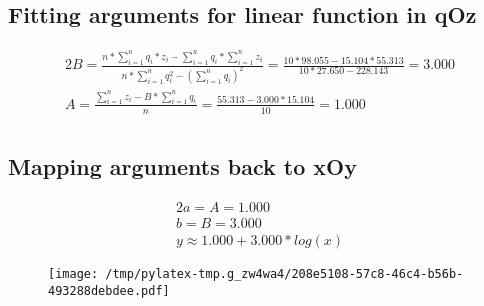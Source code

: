 \documentclass{article}%
\begin{document}
\subsection{Fitting arguments for linear function in qOz}%
\label{subsec:FittingargumentsforlinearfunctioninqOz}%
\begin{alignat*}{2}%
B
                    = \frac {n * \sum\limits_{i = 1}^n {q_i * z_i} - \sum\limits_{i = 1}^n {q_i} * \sum\limits_{i = 1}^n {z_i}}
                        {n * \sum\limits_{i = 1}^n {q_i^2} - (\sum\limits_{i = 1}^n {q_i}) ^ 2}
                    = \frac {10 * 98.055 - 15.104 * 55.313}
                        {10 * 27.650 - 228.143}
                    = 3.000 \\%
A
                    = \frac {\sum\limits_{i = 1}^n {z_i} - B * \sum\limits_{i = 1}^{n} {q_i}} n
                    = \frac {55.313 - 3.000 * 15.104} {10}
                    = 1.000 \\%
\end{alignat*}

%
\subsection{Mapping arguments back to xOy}%
\label{subsec:MappingargumentsbacktoxOy}%
\begin{alignat*}{2}%
a = A = 1.000 \\%
b = B = 3.000 \\%
y \approx1.000 + 3.000 * log(x)%
\end{alignat*}%


\begin{figure}[htbp]%
\centering%
\texttt{[image: /tmp/pylatex-tmp.g\_zw4wa4/208e5108-57c8-46c4-b56b-493288debdee.pdf]}%
\end{figure}

%
\end{document}
